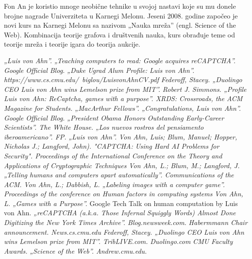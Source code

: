 \documentclass[titlepage, 12pt]{article}
\begin{document}
Fon An je koristio mnoge neobične tehnike u svojoj nastavi koje su mu donele brojne nagrade Univerziteta u Karnegi Melonu. Jeseni 2008. godine započeo je novi kurs na Karnegi Melonu sa nazivom „Nauka mreža” (engl. Science of the Web). Kombinacija teorije grafova i društvenih nauka, kurs obrađuje teme od teorije mreža i teorije igara do teorija aukcije.

\begin{thebibliography}{9}
    \textit{„Luis von Ahn”.}
    \textit{„Teaching computers to read: Google acquires reCAPTCHA”. Google Official Blog.}
    \textit{„Duke Ugrad Alum Profile: Luis von Ahn”.}
    \textit{https://www.cs.cmu.edu/~biglou/LuisvonAhnCV.pdf}
    \textit{Federoff, Stacey. „Duolingo CEO Luis von Ahn wins Lemelson prize from MIT”.}
    \textit{Robert J. Simmons. „Profile Luis von Ahn: ReCaptcha, games with a purpose”. XRDS: Crossroads, the ACM Magazine for Students.}
    \textit{„MacArthur Fellows”.}
    \textit{„Congratulations, Luis von Ahn”. Google Official Blog.}
    \textit{„President Obama Honors Outstanding Early-Career Scientists”. The White House.}
    \textit{„Los nuevos rostros del pensiamento iberoamericano”. FP.}
    \textit{„Luis von Ahn”.}
    \textit{Von Ahn, Luis; Blum, Manuel; Hopper, Nicholas J.; Langford, John). "CAPTCHA: Using Hard AI Problems for Security". Proceedings of the International Conference on the Theory and Applications of Cryptographic Techniques}
    \textit{Von Ahn, L.; Blum, M.; Langford, J. „Telling humans and computers apart automatically”. Communications of the ACM.}
    \textit{Von Ahn, L.; Dabbish, L. „Labeling images with a computer game”. Proceedings of the conference on Human factors in computing systems}
    \textit{Von Ahn, L. „Games with a Purpose”.}
 Google Tech Talk on human computation by Luis von Ahn.
    \textit{„reCAPTCHA (a.k.a. Those Infernal Squiggly Words) Almost Done Digitizing the New York Times Archive”. Blog.newsweek.com.}
    \textit{Habermmann Chair announcement. News.cs.cmu.edu}
    \textit{Federoff, Stacey. „Duolingo CEO Luis von Ahn wins Lemelson prize from MIT”. TribLIVE.com.}
    \textit{Duolingo.com}
    \textit{CMU Faculty Awards.}
    \textit{„Science of the Web”. Andrew.cmu.edu.}
\end{thebibliography}
\end{document}
